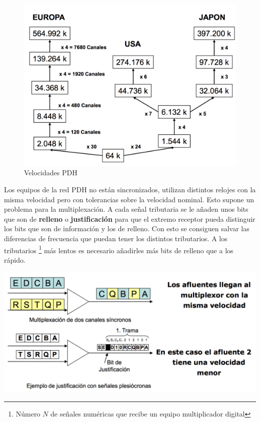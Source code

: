\documentclass[10pt,portrait, twocolumn]{article}
\makeatletter
\renewcommand{\subsubsection}{\@startsection{subsubsection}{3}{0mm}%
                                {-1ex plus -.5ex minus -.2ex}%
                                {1ex plus .2ex}%
                                {\normalfont\small\bfseries}}
\makeatother
\begin{document}
	\begin{figure}[!ht]
 		\centering
  		 \includegraphics[scale = 0.35]{images/VelocidadPDH}
		\caption{Velocidades PDH}
	\end{figure}



Los equipos de la red PDH no están sincronizados, utilizan distintos relojes con la misma velocidad pero con tolerancias sobre la velocidad nominal. Esto supone un problema para la multiplexación. A cada señal tributaria se le añaden unos bits que son de \textbf{relleno} o \textbf{justificación} para que el extremo receptor pueda distinguir los bits que son de información y los de relleno. Con esto se consiguen salvar las diferencias de frecuencia que puedan tener los distintos tributarios. A los tributarios \footnote{Número $N$ de señales numéricas que recibe un equipo multiplicador digital} más lentos es necesario añadirles más bits de relleno que a los rápido.

	\begin{center}
		\includegraphics[scale=0.35]{images/JustificacionPDH}
	\end{center}	
\end{document}
